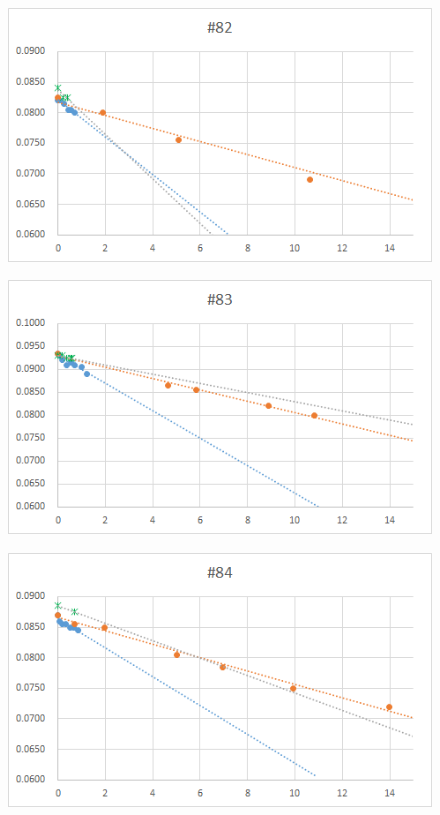   \begin{figure}[htbp]
    \centering
       \includegraphics[width=120mm]{vol_082.png}
  \end{figure}
  \begin{figure}[htbp]
    \centering
       \includegraphics[width=120mm]{vol_083.png}
  \end{figure}
  \begin{figure}[htbp]
    \centering
       \includegraphics[width=120mm]{vol_084.png}
  \end{figure}
